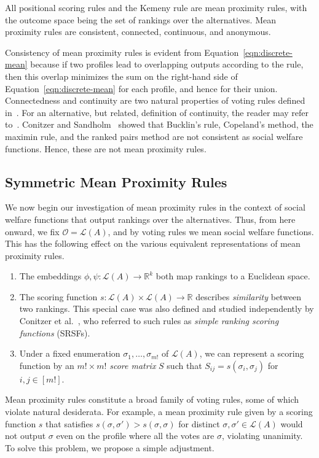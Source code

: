 \documentclass[prodmode]{acmsmall-ec14}
\newcommand{\calL}{{\mathcal{L}}}
\newcommand{\rank}{{\calL(A)}}
\newcommand{\calO}{{\mathcal{O}}}
\newcommand{\kibitz}[2]{\ifnum\Comments=1\textcolor{#1}{#2}\fi}
\newcommand{\ns}[1]{\kibitz{red} {[NS: #1]}}
\begin{document}
\begin{proposition}
All positional scoring rules and the Kemeny rule are mean proximity rules, with the outcome space being the set of rankings over the alternatives. Mean proximity rules are consistent, connected, continuous, and anonymous.
\label{prop:properties}
\end{proposition}
%
Consistency of mean proximity rules is evident from Equation~\eqref{eqn:discrete-mean} because if two profiles lead to overlapping outputs according to the rule, then this overlap minimizes the sum on the right-hand side of Equation~\eqref{eqn:discrete-mean} for each profile, and hence for their union. Connectedness and continuity are two natural properties of voting rules defined in~\cite{Zwicker08a}. For an alternative, but related, definition of continuity, the reader may refer to~\cite{CRX09}. Conitzer and Sandholm~ showed that Bucklin's rule, Copeland's method, the maximin rule, and the ranked pairs method are not consistent as social welfare functions. Hence, these are not mean proximity rules. 


\subsection{Symmetric Mean Proximity Rules}
\label{sec:symm}

We now begin our investigation of mean proximity rules in the context of social welfare functions that output rankings over the alternatives. Thus, from here onward, we fix $\calO = \rank$, and by voting rules we mean social welfare functions. This has the following effect on the various equivalent representations of mean proximity rules.
\begin{enumerate}
\item The embeddings $\phi,\psi : \rank \to \mathbb{R}^k$ both map rankings to a Euclidean space. 
\item The scoring function $s : \rank \times \rank \rightarrow \mathbb{R}$ describes \emph{similarity} between two rankings. This special case was also defined and studied independently by Conitzer et al.~, who referred to such rules as \emph{simple ranking scoring functions} (SRSFs). 
\item Under a fixed enumeration $\sigma_1,\ldots,\sigma_{m!}$ of $\rank$, we can represent a scoring function by an $m! \times m!$ \emph{score matrix} $S$ such that $S_{ij} = s(\sigma_i,\sigma_j)$ for $i,j \in [m!]$.
\end{enumerate}
%
Mean proximity rules constitute a broad family of voting rules, some of which violate natural desiderata. For example, a mean proximity rule given by a scoring function $s$ that satisfies $s(\sigma,\sigma') > s(\sigma,\sigma)$ for distinct $\sigma,\sigma' \in \rank$ would not output $\sigma$ even on the profile where all the votes are $\sigma$, violating unanimity. To solve this problem, we propose a simple adjustment. 
\end{document}

